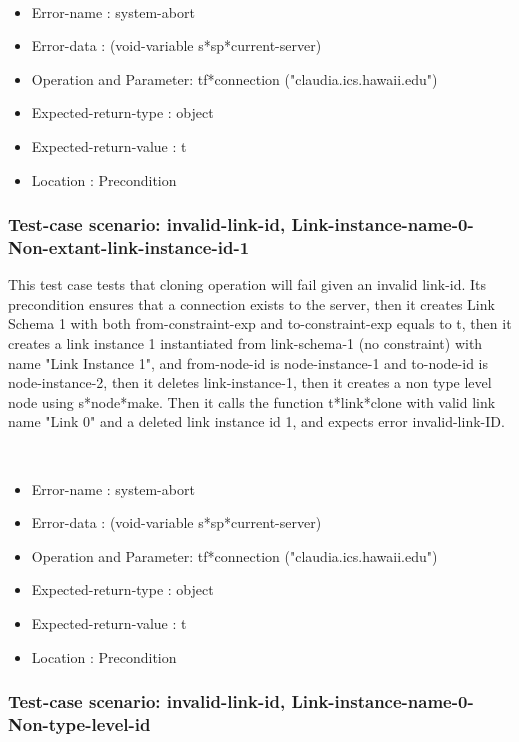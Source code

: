 \
\begin {itemize}
\item 	Error-name             : system-abort
\item Error-data             : (void-variable s*sp*current-server)
\item Operation and Parameter: tf*connection ("claudia.ics.hawaii.edu")
\item Expected-return-type   : object
\item Expected-return-value  : t
\item Location               : Precondition



\end {itemize}
\subsubsection {Test-case scenario: invalid-link-id, Link-instance-name-0-Non-extant-link-instance-id-1}


This test case tests that cloning operation will fail given an invalid link-id.
Its precondition ensures that a connection exists to the server, then it creates Link Schema 1 with both from-constraint-exp and to-constraint-exp equals to t, then it creates a link instance 1 instantiated from  link-schema-1 (no constraint) with name "Link Instance 1", and from-node-id is node-instance-1 and to-node-id is node-instance-2, then it deletes link-instance-1, then it creates a non type level node using s*node*make.
Then it calls the function t*link*clone  with valid link name "Link 0" and a deleted link instance id 1, and expects error invalid-link-ID.



\
\begin {itemize}
\item 	Error-name             : system-abort
\item Error-data             : (void-variable s*sp*current-server)
\item Operation and Parameter: tf*connection ("claudia.ics.hawaii.edu")
\item Expected-return-type   : object
\item Expected-return-value  : t
\item Location               : Precondition



\end {itemize}
\subsubsection {Test-case scenario: invalid-link-id, Link-instance-name-0-Non-type-level-id}


